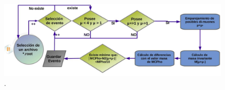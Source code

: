 \begin{figure}[ht]
\centering
\includegraphics[width=1\textwidth]{Simulacion/imagenes/proceso_genera_darksusy2_.png}
\caption{.}
\label{genera_darksusy}
\end{figure}